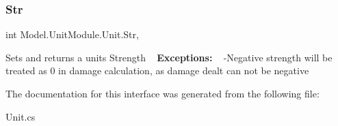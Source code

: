 \subsubsection{\texorpdfstring{Str}{Str}}
{\footnotesize\ttfamily int Model.\+Unit\+Module.\+Unit.\+Str\hspace{0.3cm}{\ttfamily [get]}, {\ttfamily [set]}}

Sets and returns a unit\textquotesingle{}s Strength ~\newline
 {\bfseries Exceptions\+:} ~\newline
 -\/\+Negative strength will be treated as 0 in damage calculation, as damage dealt can not be negative 

The documentation for this interface was generated from the following file\+:\begin{DoxyCompactItemize}
\item 
Unit.\+cs\end{DoxyCompactItemize}
